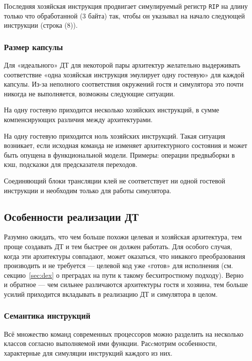 Последняя хозяйская инструкция продвигает симулируемый регистр \texttt{RIP} на длину только что обработанной (3 байта) так, чтобы он указывал на начало следующей инструкции (строка (8)).

\subsubsection{Размер капсулы}
Для «идеального» ДТ для некоторой пары архитектур желательно выдерживать соответствие «одна хозяйская инструкция эмулирует одну гостевую» для каждой капсулы. Из-за неполного соответствия окружений гостя и симулятора это почти никогда не выполняется, возможны следующие ситуации.

\begin{enumerate*}
    \item На одну гостевую приходится несколько хозяйских инструкций, в сумме компенсирующих различия между архитектурами.
    \item На одну гостевую приходится ноль хозяйских инструкций. Такая ситуация возникает, если исходная команда не изменяет архитектурного состояния и может быть опущена в функциональной модели. Примеры: операции предвыборки в кэш, подсказки для предсказателя переходов.
    \item Соединяющий блоки трансляции клей не соответствует ни одной гостевой инструкции и необходим только для работы симулятора.
\end{enumerate*}


\subsection{Особенности реализации ДТ}

Разумно ожидать, что чем больше похожи целевая и хозяйская архитектура, тем проще создавать ДТ и тем быстрее он должен работать. Для особого случая, когда эти архитектуры совпадают, может оказаться, что никакого преобразования производить и не требуется — целевой код уже «готов» для исполнения (см. секцию~\ref{sec:dex} о  преградах на пути к такому бесхитростному подходу). Верно и обратное — чем сильнее различаются архитектуры гостя и хозяина, тем больше усилий приходится вкладывать в реализацию ДТ и симулятора в целом.

\subsubsection{Семантика инструкций}

Всё множество команд современных процессоров можно разделить на несколько классов согласно выполняемой ими функции. Расcмотрим особенности, характерные для симуляции инструкций каждого из них.

